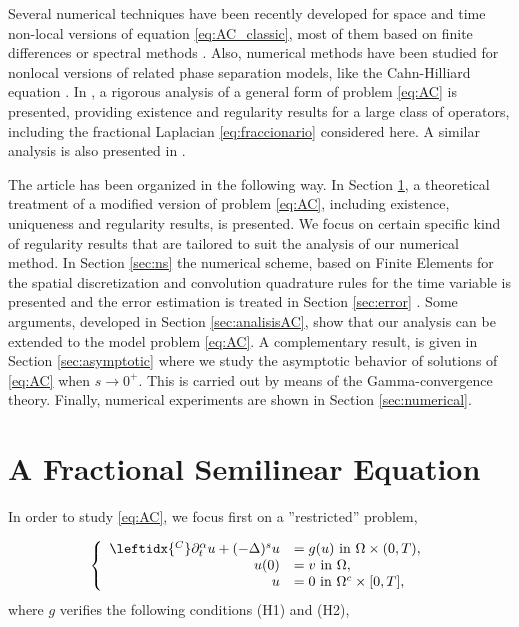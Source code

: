 \documentclass{amsart}
\newcommand{\ppa}{\leftidx{^C}\partial_t^\alpha}
\newcommand{\fmonio}{g}
\theoremstyle{remark}
\theoremstyle{definition}
\numberwithin{equation}{section}
\begin{document}
 
		
  Several numerical techniques have been recently developed for space and time non-local versions of equation \eqref{eq:AC_classic}, most of them based on finite differences or spectral methods  \cite{hongwang,HPH,SXKE,HTY,LWY,akagi}. Also, numerical methods have been studied for nonlocal versions of related phase separation models, like the Cahn-Hilliard equation  \cite{ains,ains2}. In  \cite{gal17}, a rigorous analysis of a general form of problem \eqref{eq:AC} is presented, providing existence and regularity results for a large class of operators, including the fractional Laplacian \eqref{eq:fraccionario} considered here. A similar analysis is also presented in \cite{tesisneto}.

The article has been organized in the following way. In  Section \ref{sec:AC_eq}, a theoretical treatment of a modified version of problem \eqref{eq:AC}, including 
 existence, uniqueness and regularity results, is presented.  We focus on certain specific kind of regularity results that are  tailored to suit the analysis of our numerical method. In Section \ref{sec:ns}  the numerical scheme, based on  Finite Elements for the spatial discretization and convolution quadrature rules for the time variable is presented and the error estimation is treated in Section \ref{sec:error} . Some arguments, developed in  Section \ref{sec:analisisAC}, show that our analysis can be extended to the model problem   \eqref{eq:AC}. A complementary result, is given in Section \ref{sec:asymptotic} where we study the asymptotic behavior of solutions of \eqref{eq:AC} when $s \to 0^+$. This is carried out by means of  the Gamma-convergence theory. Finally, numerical experiments are shown in Section \ref{sec:numerical}.                  
     
\section{ A Fractional Semilinear Equation} \label{sec:AC_eq}
In order to study \eqref{eq:AC}, we focus first on a ''restricted'' problem, 

\begin{equation}
\left\lbrace
  \begin{array}{rl}      
 \ppa u +  (-\Delta)^su  & = \fmonio(u)  \text{ in } \Omega \times (0,T), \\
 u(0)  & = v  \text{ in } \Omega, \\
u & =  0  \text{ in }  \Omega^c\times[0,T],
\end{array}
    \right.
\label{eq:AC_trunc}
\end{equation}
where $g$ verifies the following conditions (H1) and (H2),  
\end{document}
